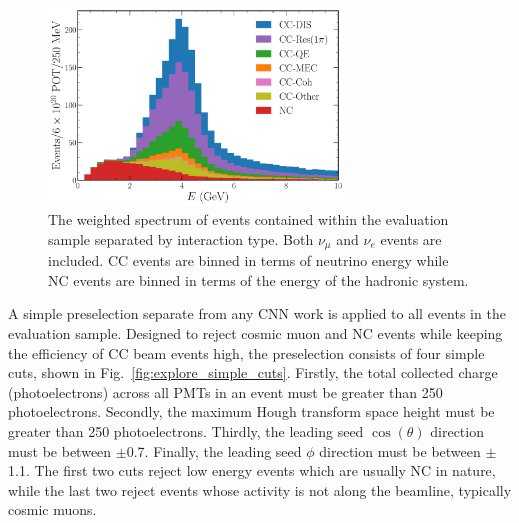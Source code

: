 \begin{figure} %
    \includegraphics[width=0.7\textwidth]{diagrams/6-cvn/chipsnet/explore_stacked_int_types.pdf}
    \caption[Weighted spectrum of interaction types within the evaluation sample.]
    {The weighted spectrum of events contained within the evaluation sample separated by
        interaction type. Both $\nu_{\mu}$ and $\nu_{e}$ events are included. CC events are binned
        in terms of neutrino energy while NC events are binned in terms of the energy of the
        hadronic system.}
    \label{fig:explore_stacked_int_types}
\end{figure}

A simple preselection separate from any CNN work is applied to all events in the evaluation
sample. Designed to reject cosmic muon and NC events while keeping the efficiency of CC beam
events high, the preselection consists of four simple cuts, shown in
Fig.~\ref{fig:explore_simple_cuts}. Firstly, the total collected charge (photoelectrons) across
all PMTs in an event must be greater than 250 photoelectrons. Secondly, the maximum Hough
transform space height must be greater than 250 photoelectrons. Thirdly, the leading seed
$\cos(\theta)$ direction must be between $\pm$0.7. Finally, the leading seed $\phi$ direction must
be between $\pm$1.1. The first two cuts reject low energy events which are usually NC in nature,
while the last two reject events whose activity is not along the beamline, typically cosmic muons.

